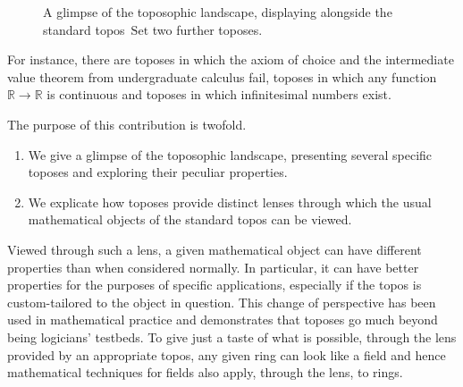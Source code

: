 \documentclass[oneside,reqno]{amsart}
\theoremstyle{definition}
\theoremstyle{plain}
\theoremstyle{remark}
\newcommand{\RR}{\mathbb{R}}
\newcommand{\Set}{\mathrm{Set}}
\renewcommand{\_}{\mathpunct{.}\,}
\newcommand{\?}{\,{:}\,}
\begin{document}
\begin{figure}[b]

  \caption{\label{fig:landscape}A glimpse of the toposophic landscape,
  displaying alongside the standard topos~$\Set$ two further toposes.}
\end{figure}


For instance, there are toposes in which the axiom of choice and the
intermediate value theorem from undergraduate calculus fail, toposes in which
any function~$\RR \to \RR$ is continuous and toposes in which infinitesimal
numbers exist.

The purpose of this contribution is twofold.
\begin{enumerate}
\item We give a glimpse of the toposophic landscape, presenting several
specific toposes and exploring their peculiar properties.

\item We explicate how toposes provide distinct lenses through which the
usual mathematical objects of the standard topos can be viewed.
\end{enumerate}

Viewed through such a lens, a given mathematical object can have different
properties than when considered normally. In particular, it can have
better properties for the purposes of specific applications, especially if
the topos is custom-tailored to the object in question. This change of
perspective has been used in mathematical practice and demonstrates that
toposes go much beyond being logicians' testbeds. To give just a taste of what
is possible, through the lens provided by an appropriate topos, any given ring
can look like a field and hence mathematical techniques for fields also apply,
through the lens, to rings.
\end{document}
